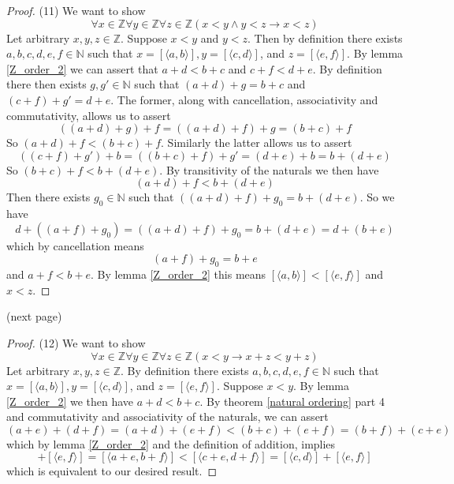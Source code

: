 \documentclass{report}
\begin{document}
\begin{proof}(11) We want to show
\begin{equation*}
\forall x\in\mathbb Z\forall y\in\mathbb Z\forall z\in\mathbb Z(x<y\land y<z\to x<z)
\end{equation*}
Let arbitrary $x,y,z\in\mathbb Z$. Suppose $x<y$ and $y<z$. Then by definition there exists $a,b,c,d,e,f\in\mathbb N$ such that 
$x=[\langle a,b\rangle], y=[\langle c,d\rangle]$, and $z=[\langle e,f\rangle]$. By lemma \ref{Z_order_2} we can assert that $a+d<b+c$ and 
$c+f<d+e$. By definition there then exists $g,g'\in\mathbb N$ such that
$(a+d)+g=b+c$ and $(c+f)+g'=d+e$. The former, along with cancellation, associativity and commutativity, allows us to assert
\begin{equation*}
((a+d)+g)+f=((a+d)+f)+g=(b+c)+f
\end{equation*}
So $(a+d)+f<(b+c)+f$. Similarly the latter allows us to assert
\begin{equation*}
((c+f)+g')+b=((b+c)+f)+g'=(d+e)+b=b+(d+e)
\end{equation*}
So $(b+c)+f<b+(d+e)$. By transitivity of the naturals we then have
\begin{equation*}
(a+d)+f<b+(d+e)
\end{equation*}
Then there exists $g_0\in\mathbb N$ such that 
$((a+d)+f)+g_0=b+(d+e)$. So we have
\begin{equation*}
d+((a+f)+g_0)=((a+d)+f)+g_0=b+(d+e)=d+(b+e)
\end{equation*}
which by cancellation means
\begin{equation*}
(a+f)+g_0=b+e
\end{equation*}
and $a+f<b+e$. By lemma \ref{Z_order_2} this means $[\langle a,b\rangle]<[\langle e,f\rangle]$ and $x<z$.
\end{proof}
\noindent(next page)\newpage
\begin{proof}(12)
We want to show
\begin{equation*}
\forall x\in\mathbb Z\forall y\in\mathbb Z\forall z\in\mathbb Z(x<y\to x+z<y+z)
\end{equation*}
Let arbitrary $x,y,z\in\mathbb Z$. By definition there exists $a,b,c,d,e,f\in\mathbb N$ such that 
$x=[\langle a,b\rangle], y=[\langle c,d\rangle]$, and $z=[\langle e,f\rangle]$. Suppose $x<y$. By lemma \ref{Z_order_2} we then have
$a+d<b+c$. By theorem \ref{natural ordering} part 4 and  commutativity and associativity of the naturals, we can assert
\begin{equation*}
(a+e)+(d+f)=(a+d)+(e+f)<(b+c)+(e+f)=(b+f)+(c+e)
\end{equation*}
which by lemma \ref{Z_order_2} and the definition of addition, implies
\begin{equation*}
[\langle a,b\rangle]+[\langle e,f\rangle]=[\langle a+e,b+f\rangle]<[\langle c+e,d+f\rangle]=[\langle c,d\rangle]+[\langle e,f\rangle]
\end{equation*}
which is equivalent to our desired result.
\end{proof}
\end{document}
